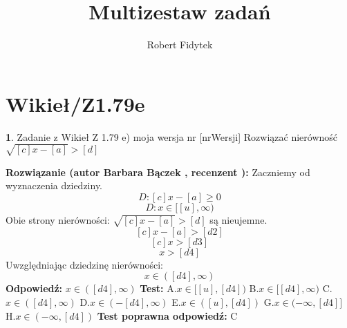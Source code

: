 \documentclass[12pt, a4paper]{article}
\title{Multizestaw zadań}
\author{Robert Fidytek}
\date{}
\theoremstyle{definition} %
\newtheorem{zad}{}
\newcommand{\kategoria}[1]{\section{#1}} %
\newcommand{\zadStart}[1]{\begin{zad}#1\newline} %
\newcommand{\zadStop}{\end{zad}}   %
\newcommand{\rozwStart}[2]{\noindent \textbf{Rozwiązanie (autor #1 , recenzent #2): }\newline} %
\newcommand{\rozwStop}{\newline}                                            %
\newcommand{\odpStart}{\noindent \textbf{Odpowiedź:}\newline}    %
\newcommand{\odpStop}{\newline}                                             %
\newcommand{\testStart}{\noindent \textbf{Test:}\newline} %
\newcommand{\testStop}{\newline} %
\newcommand{\kluczStart}{\noindent \textbf{Test poprawna odpowiedź:}\newline} %
\newcommand{\kluczStop}{\newline} %
\begin{document}
\maketitle


\kategoria{Wikieł/Z1.79e}
\zadStart{Zadanie z Wikieł Z 1.79 e) moja wersja nr [nrWersji]}
Rozwiązać nierówność $\sqrt{[c]x-[a]}>[d]$
\zadStop
\rozwStart{Barbara Bączek}{}
Zaczniemy od wyznaczenia dziedziny.
$$D: [c]x-[a] \geq 0$$
$$D: x \in [[u], \infty)$$
Obie strony nierówności: $\sqrt{[c]x-[a]}>[d]$ są nieujemne.
$$[c]x-[a]>[d2]$$
$$[c]x>[d3]$$
$$x>[d4]$$
Uwzględniając dziedzinę nierówności:
$$x \in ([d4],\infty)$$
\rozwStop
\odpStart
$x \in ([d4],\infty)$
\odpStop
\testStart
A.$x \in [[u],[d4])$
B.$x \in [[d4],\infty)$
C.$x \in ([d4],\infty)$
D.$x \in (-[d4],\infty)$
E.$x \in  ([u],[d4])$
G.$x \in (-\infty,[d4]]$
H.$x \in (-\infty,[d4])$
\testStop
\kluczStart
C
\kluczStop
\end{document}
